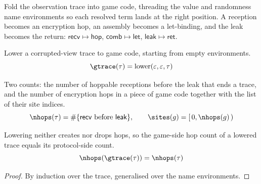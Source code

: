 \begin{definition}
  \label{def:lower_obs}
  \rocqok
  Fold the observation trace into game code, threading the value and randomness
  name environments so each resolved term lands at the right position. A
  reception becomes an encryption hop, an assembly becomes a let-binding, and the
  leak becomes the return: $\mathsf{recv}\mapsto\mathsf{hop}$,
  $\mathsf{comb}\mapsto\mathsf{let}$, $\mathsf{leak}\mapsto\mathsf{ret}$.
\end{definition}

\begin{definition}
  \label{def:game_of_trace}
  \rocqok
  Lower a corrupted-view trace to game code, starting from empty environments.
  \[ \gtrace(\tau) = \mathrm{lower}(\varepsilon, \varepsilon, \tau) \]
\end{definition}

\begin{definition}
  \label{def:count_hops}
  \rocqok
  Two counts: the number of hoppable receptions before the leak that ends a
  trace, and the number of encryption hops in a piece of game code together with
  the list of their site indices.
  \[ \nhops(\tau) = \#\{\mathsf{recv}\text{ before }\mathsf{leak}\}, \qquad
        \sites(g) = [\, 0, \nhops(g) \,) \]
\end{definition}

\begin{lemma}
  \label{lem:count_hops_adequacy}
  \rocqok
  Lowering neither creates nor drops hops, so the game-side hop count of a
  lowered trace equals its protocol-side count.
  \[ \nhops(\gtrace(\tau)) = \nhops(\tau) \]
\end{lemma}
\begin{proof}
  \rocqok
  By induction over the trace, generalised over the name environments.
\end{proof}

